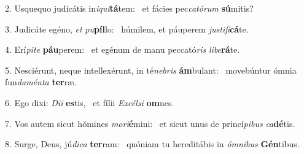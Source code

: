 2. Usquequo judicátis in\textit{i}\textit{qui}\textbf{tá}tem: \ast\  et fácies pec\textit{ca}\textit{tó}\textit{rum} \textbf{sú}mitis?\

3. Judicáte egéno, \textit{et} \textit{pu}\textbf{píl}lo: \ast\  húmilem, et páuperem \textit{jus}\textit{ti}\textit{fi}\textbf{cá}te.\

4. Erí\textit{pi}\textit{te} \textbf{páu}perem: \ast\  et egénum de manu peccató\textit{ris} \textit{li}\textit{be}\textbf{rá}te.\

5. Nesciérunt, neque intellexérunt, in té\textit{ne}\textit{bris} \textbf{ám}bulant: \ast\  movebúntur ómnia fun\textit{da}\textit{mén}\textit{ta} \textbf{ter}ræ.\

6. Ego dixi: \textit{Di}\textit{i} \textbf{es}tis, \ast\  et fílii \textit{Ex}\textit{cél}\textit{si} \textbf{om}nes.\

7. Vos autem sicut hómines \textit{mo}\textit{ri}\textbf{é}mini: \ast\  et sicut unus de princí\textit{pi}\textit{bus} \textit{ca}\textbf{dé}tis.\

8. Surge, Deus, jú\textit{di}\textit{ca} \textbf{ter}ram: \ast\  quóniam tu hereditábis in \textit{óm}\textit{ni}\textit{bus} \textbf{Gén}tibus.\

